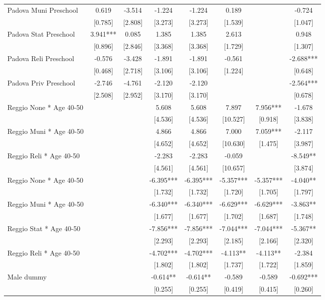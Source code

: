 \begin{tabular}{lccccccc}
Padova Muni Preschool & 0.619 & -3.514 & -1.224 & -1.224 & 0.189 &  & -0.724 \\
 & [0.785] & [2.808] & [3.273] & [3.273] & [1.539] &  & [1.047] \\
Padova Stat Preschool & 3.941*** & 0.085 & 1.385 & 1.385 & 2.613 &  & 0.948 \\
 & [0.896] & [2.846] & [3.368] & [3.368] & [1.729] &  & [1.307] \\
Padova Reli Preschool & -0.576 & -3.428 & -1.891 & -1.891 & -0.561 &  & -2.688*** \\
 & [0.468] & [2.718] & [3.106] & [3.106] & [1.224] &  & [0.648] \\
Padova Priv Preschool & -2.746 & -4.761 & -2.120 & -2.120 &  &  & -2.564*** \\
 & [2.508] & [2.952] & [3.170] & [3.170] &  &  & [0.678] \\
Reggio None * Age 40-50 &  &  & 5.608 & 5.608 & 7.897 & 7.956*** & -1.678 \\
 &  &  & [4.536] & [4.536] & [10.527] & [0.918] & [3.838] \\
Reggio Muni * Age 40-50 &  &  & 4.866 & 4.866 & 7.000 & 7.059*** & -2.117 \\
 &  &  & [4.652] & [4.652] & [10.630] & [1.475] & [3.987] \\
Reggio Reli * Age 40-50 &  &  & -2.283 & -2.283 & -0.059 &  & -8.549** \\
 &  &  & [4.561] & [4.561] & [10.657] &  & [3.874] \\
Reggio None * Age 40-50 &  &  & -6.395*** & -6.395*** & -5.357*** & -5.357*** & -4.040** \\
 &  &  & [1.732] & [1.732] & [1.720] & [1.705] & [1.797] \\
Reggio Muni * Age 40-50 &  &  & -6.340*** & -6.340*** & -6.629*** & -6.629*** & -3.863** \\
 &  &  & [1.677] & [1.677] & [1.702] & [1.687] & [1.748] \\
Reggio Stat * Age 40-50 &  &  & -7.856*** & -7.856*** & -7.044*** & -7.044*** & -5.367** \\
 &  &  & [2.293] & [2.293] & [2.185] & [2.166] & [2.320] \\
Reggio Reli * Age 40-50 &  &  & -4.702*** & -4.702*** & -4.113** & -4.113** & -2.384 \\
 &  &  & [1.802] & [1.802] & [1.737] & [1.722] & [1.859] \\
Male dummy &  &  & -0.614** & -0.614** & -0.589 & -0.589 & -0.692*** \\
 &  &  & [0.255] & [0.255] & [0.419] & [0.415] & [0.260] \\

\end{tabular}
